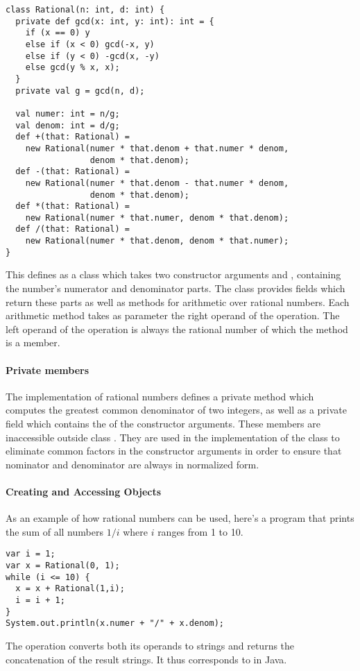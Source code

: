 \documentclass[a4paper,12pt,twoside,titlepage]{book}
\begin{document}
\begin{lstlisting}
class Rational(n: int, d: int) {
  private def gcd(x: int, y: int): int = {
    if (x == 0) y
    else if (x < 0) gcd(-x, y)
    else if (y < 0) -gcd(x, -y)
    else gcd(y % x, x);
  }
  private val g = gcd(n, d);

  val numer: int = n/g;
  val denom: int = d/g;
  def +(that: Rational) =
    new Rational(numer * that.denom + that.numer * denom,
                 denom * that.denom);
  def -(that: Rational) =
    new Rational(numer * that.denom - that.numer * denom, 
                 denom * that.denom);
  def *(that: Rational) =
    new Rational(numer * that.numer, denom * that.denom);
  def /(that: Rational) =
    new Rational(numer * that.denom, denom * that.numer);
}
\end{lstlisting}
This defines  as a class which takes two constructor
arguments  and , containing the number's numerator and
denominator parts.  The class provides fields which return these parts
as well as methods for arithmetic over rational numbers.  Each
arithmetic method takes as parameter the right operand of the
operation. The left operand of the operation is always the rational
number of which the method is a member.

\paragraph{Private members}
The implementation of rational numbers defines a private method
 which computes the greatest common denominator of two
integers, as well as a private field  which contains the
 of the constructor arguments. These members are inaccessible
outside class . They are used in the implementation of
the class to eliminate common factors in the constructor arguments in
order to ensure that nominator and denominator are always in
normalized form.

\paragraph{Creating and Accessing Objects}
As an example of how rational numbers can be used, here's a program
that prints the sum of all numbers $1/i$ where $i$ ranges from 1 to 10.
\begin{lstlisting}
var i = 1;
var x = Rational(0, 1);
while (i <= 10) {
  x = x + Rational(1,i);
  i = i + 1;
}
System.out.println(x.numer + "/" + x.denom);
\end{lstlisting}
The \code{+} operation converts both its operands to strings and returns the
concatenation of the result strings. It thus corresponds to \code{+} in Java. 
  
\end{document}
